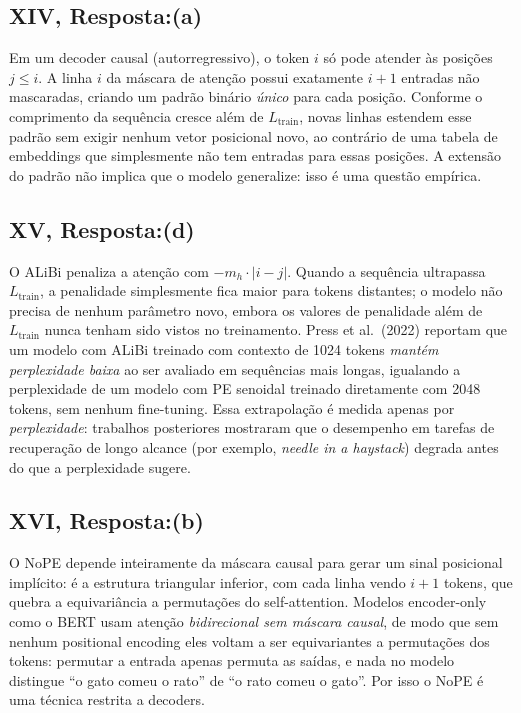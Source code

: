 \documentclass{dlproblemset}
\begin{document}
\subsection*{XIV, Resposta:(a)}
Em um decoder causal (autorregressivo), o token $i$ só pode atender às posições
$j \leq i$. A linha $i$ da máscara de atenção possui exatamente $i+1$ entradas não
mascaradas, criando um padrão binário \emph{único} para cada posição. Conforme o
comprimento da sequência cresce além de $L_{\mathrm{train}}$, novas linhas estendem esse
padrão sem exigir nenhum vetor posicional novo, ao contrário de uma tabela de embeddings
que simplesmente não tem entradas para essas posições. A extensão do padrão não implica
que o modelo generalize: isso é uma questão empírica.

\subsection*{XV, Resposta:(d)}
O ALiBi penaliza a atenção com $-m_h \cdot |i-j|$. Quando a sequência ultrapassa
$L_{\mathrm{train}}$, a penalidade simplesmente fica maior para tokens distantes; o
modelo não precisa de nenhum parâmetro novo, embora os valores de penalidade além de
$L_{\mathrm{train}}$ nunca tenham sido vistos no treinamento. Press et al.\
(2022) reportam que um modelo com ALiBi treinado com contexto de 1024 tokens
\emph{mantém perplexidade baixa} ao ser avaliado em sequências mais longas,
igualando a perplexidade de um modelo com PE senoidal treinado diretamente com
2048 tokens, sem nenhum fine-tuning. Essa extrapolação é medida apenas por
\emph{perplexidade}: trabalhos posteriores mostraram que o desempenho em tarefas de
recuperação de longo alcance (por exemplo, \textit{needle in a haystack}) degrada
antes do que a perplexidade sugere.

\subsection*{XVI, Resposta:(b)}
O NoPE depende inteiramente da máscara causal para gerar um sinal posicional
implícito: é a estrutura triangular inferior, com cada linha vendo $i+1$ tokens, que
quebra a equivariância a permutações do self-attention. Modelos encoder-only como o
BERT usam atenção \emph{bidirecional sem máscara causal}, de modo que sem nenhum
positional encoding eles voltam a ser equivariantes a permutações dos tokens: permutar
a entrada apenas permuta as saídas, e nada no modelo distingue ``o gato comeu o rato''
de ``o rato comeu o gato''. Por isso o NoPE é uma técnica restrita a decoders.
\end{document}
